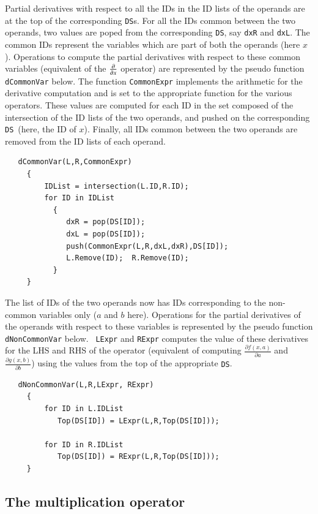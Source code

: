 \documentclass[12pt]{article}
\newcommand{\DS}{{\tt DS}}
\begin{document}
Partial derivatives with respect to all the IDs in the ID lists of the
operands are at the top of the corresponding \DS s.  For all the IDs
common between the two operands, two values are poped from the
corresponding \DS, say {\tt dxR} and {\tt dxL}.  The common IDs
represent the variables which are part of both the operands (here
$x$).  Operations to compute the partial derivatives with respect to
these common variables (equivalent of the ${\partial \over \partial
x}$ operator) are represented by the pseudo function {\tt dCommonVar}
below.  The function {\tt CommonExpr} implements the arithmetic for
the derivative computation and is set to the appropriate function for
the various operators.  These values are computed for each ID in the
set composed of the intersection of the ID lists of the two operands,
and pushed on the corresponding \DS\ (here, the ID of $x$).  Finally,
all IDs common between the two operands are removed from the ID lists
of each operand.
\begin{verbatim}
   dCommonVar(L,R,CommonExpr) 
     { 
         IDList = intersection(L.ID,R.ID); 
         for ID in IDList 
           { 
              dxR = pop(DS[ID]); 
              dxL = pop(DS[ID]); 
              push(CommonExpr(L,R,dxL,dxR),DS[ID]);
              L.Remove(ID);  R.Remove(ID); 
           } 
     }
\end{verbatim}
The list of IDs of the two operands now has IDs corresponding to the
non-common variables only ($a$ and $b$ here).  Operations for the
partial derivatives of the operands with respect to these variables is
represented by the pseudo function {\tt dNonCommonVar} below.  {\tt
LExpr} and {\tt RExpr} computes the value of these derivatives for the
LHS and RHS of the operator (equivalent of computing $\frac{\partial
f(x,a)}{\partial a}$ and $\frac{\partial g(x,b)}{\partial b}$) using
the values from the top of the appropriate
\DS.
\begin{verbatim}
   dNonCommonVar(L,R,LExpr, RExpr)
     {
         for ID in L.IDList
            Top(DS[ID]) = LExpr(L,R,Top(DS[ID]));

         for ID in R.IDList
            Top(DS[ID]) = RExpr(L,R,Top(DS[ID]));
     }
\end{verbatim}
%
%
\subsection{The multiplication operator}
\end{document}
